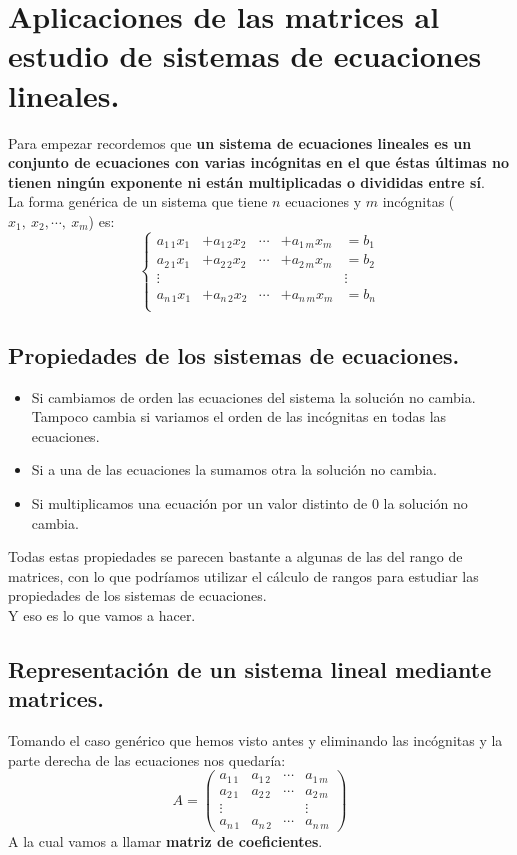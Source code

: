 \documentclass[a4paper,11pt,answers]{exam}
\begin{document}
\section{Aplicaciones de las matrices al estudio de sistemas de ecuaciones lineales.}
Para empezar recordemos que \textbf{un sistema de ecuaciones lineales es un conjunto de ecuaciones con varias incógnitas en el que éstas últimas no tienen ningún exponente ni están multiplicadas o divididas entre sí}.\\

La forma genérica de un sistema que tiene $n$ ecuaciones y $m$ incógnitas ($x_1,\ x_2, \cdots,\ x_m$) es:
\[\left\lbrace
\begin{array}{ccccr}
	a_{1\,1}x_1 &+ a_{1\,2} x_ 2&\cdots&+a_{1\,m}x_m &= b_1\\
	a_{2\,1}x_1 &+ a_{2\,2} x_ 2&\cdots&+a_{2\,m}x_m &= b_2\\
	\vdots&&&&\vdots\\
	a_{n\,1}x_1 &+ a_{n\,2} x_ 2&\cdots&+a_{n\,m}x_m &= b_n\\
\end{array}
\right.\]

\subsection{Propiedades de los sistemas de ecuaciones.}
\begin{itemize}
	\item Si cambiamos de orden las ecuaciones del sistema la solución no cambia. Tampoco cambia si variamos el orden de las incógnitas en todas las ecuaciones.
	\item Si a una de las ecuaciones la sumamos otra la solución no cambia.
	\item Si multiplicamos una ecuación por un valor distinto de 0 la solución no cambia.
\end{itemize}

Todas estas propiedades se parecen bastante a algunas de las del rango de matrices, con lo que podríamos utilizar el cálculo de rangos para estudiar las propiedades de los sistemas de ecuaciones.\\
Y eso es lo que vamos a hacer.

\subsection{Representación de un sistema lineal mediante matrices.}
Tomando el caso genérico que hemos visto antes y eliminando las incógnitas y la parte derecha de las ecuaciones nos quedaría:
\[A= \left(
\begin{array}{cccc}
	a_{1\,1}& a_{1\,2}&\cdots&a_{1\,m}\\
	a_{2\,1}&a_{2\,2}&\cdots&a_{2\,m}\\
	\vdots&&&\vdots\\
	a_{n\,1}& a_{n\,2}&\cdots&a_{n\,m}
\end{array}
\right)\]
A la cual vamos a llamar \textbf{matriz de coeficientes}.\\
\end{document}
